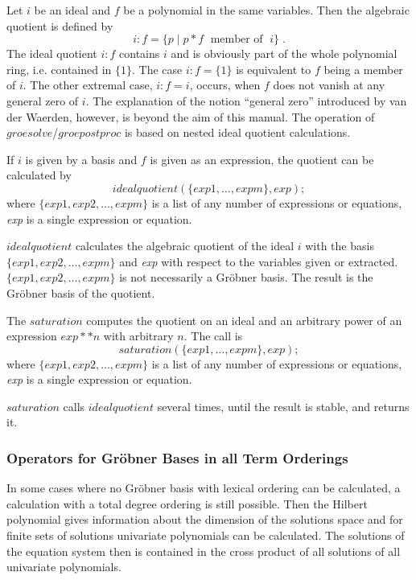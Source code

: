  
Let $i$ be an ideal and $f$ be a polynomial in the same
variables. Then the algebraic quotient is defined by
\[
i:f = \{ p \;| \; p * f \;\mbox{    member of }\; i\}\;.
\]
The ideal quotient $i:f$ contains $i$ and is obviously part of the
whole polynomial ring, i.e. contained in $\{1\}$. The case $i:f =
\{1\}$ is equivalent to $f$ being a member of  $i$. The other extremal
case, $i:f=i$, occurs, when $f$ does not vanish at any general zero of $i$.
The explanation of the notion ``general zero'' introduced by van der
Waerden, however, is beyond the aim of this manual. The operation
of $groesolve$/$groepostproc$ is based on nested ideal quotient
calculations.

If $i$ is given by a basis and $f$ is given as an expression, the
quotient can be calculated by
\[
idealquotient (\{exp1, \ldots , expm\}, exp); \]
where $\{exp1, exp2, \ldots , expm\}$ is a list of any number of
expressions or equations, {\it exp} is a single expression or equation.

$idealquotient$ calculates the algebraic quotient of the ideal $i$
with the basis  $\{exp1, exp2, \ldots , expm\}$ and {\it exp} with
respect to  the variables given or extracted.  $\{exp1, exp2, \ldots ,
expm\}$ is not necessarily a Gr\"obner basis.
The result is the Gr\"obner basis of the quotient.

The $saturation$ computes the quotient on an ideal and an arbitrary power
of an expression $exp**n$ with arbitrary $n$. The call is
\[ saturation (\{exp1, \ldots , expm\}, exp); \]
where $\{exp1, exp2, \ldots , expm\}$ is a list of any number of
expressions or equations, {\it exp} is a single expression or equation.

$saturation$ calls $idealquotient$ several times, until the result is
stable, and returns it.

\subsubsection{Operators for Gr\"obner Bases in all Term Orderings}
In some cases where no Gr\"obner
basis with lexical ordering can be calculated, a calculation with a total
degree ordering is still possible. Then the Hilbert polynomial gives
information about the dimension of the solutions space and for finite
sets of solutions univariate polynomials can be calculated. The solutions
of the equation system then is contained in the cross product of all
solutions of all univariate polynomials.

